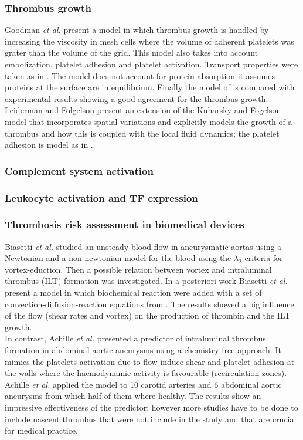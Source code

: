 \documentclass[%
 nofootinbib,
 amsmath,amssymb,
 aps,
 pra,
]{revtex4-1}
\begin{document}
\subsubsection{Thrombus growth}
Goodman \textit{et al.} \citep{Goodman:2005} present a model in which thrombus growth is handled by increasing the viscosity in mesh cells where the volume of adherent platelets was grater than the volume of the grid. This model also takes into account embolization, platelet adhesion and platelet activation. Transport properties were taken as in \citep{Wootton:2002}. The model does not account for protein absorption it assumes proteins at the surface are in equilibrium. Finally the model of \citet{Goodman:2005} is compared with experimental results showing a good agreement for the thrombus growth.\\
Leiderman and Folgelson \citep{Leiderman:2011} present an extension of the Kuharsky and Fogelson \citep{Kuharsky:2001} model that incorporates spatial variations and explicitly models the growth of a thrombus and how this is coupled with the local fluid dynamics; the platelet adhesion is model as in \citet{Fogelson:2004}.\\
\subsubsection{Complement system activation}
\subsubsection{Leukocyte activation and TF expression}
\subsubsection{Thrombosis risk assessment in biomedical devices}
Biasetti \textit{et al.} \citep{Biasetti:2011} studied an unsteady blood flow in aneurysmatic aortas using a Newtonian and a non newtonian model for the blood using the $\lambda_{2}$ criteria for vortex-eduction. Then a possible relation between vortex and intraluminal thrombus (ILT) formation was investigated. In a posteriori work Biasetti \textit{et al.} \citep{Biasetti:2012} present a model in which biochemical reaction were added with a set of convection-diffusion-reaction equations from \citep{Jones:1994}. The results showed a big influence of the flow (shear rates and vortex) on the production of thrombin and the ILT growth.\\
In contrast, Achille \textit{et al.} \citep{Achille:2014} presented a predictor of intraluminal thrombus formation in abdominal aortic aneurysms using a chemistry-free approach. It mimics the platelets activation due to flow-induce shear and platelet adhesion at the walls where the haemodynamic activity is favourable (recirculation zones). Achille \textit{et al.} applied the model to 10 carotid arteries and 6 abdominal aortic aneurysms from which half of them where healthy. The results show an impressive effectiveness of the predictor; however more studies have to be done to include nascent thrombus that were not include in the study and that are crucial for medical practice.\\
\end{document}

